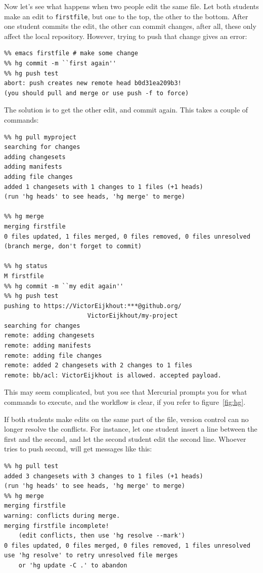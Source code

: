 Now let's see what happens when two people edit the same file.
Let both students make an edit to \verb+firstfile+, but one to the
top, the other to the bottom. After one student commits the edit, the
other can commit changes, after all, these only affect the local repository.
However, trying to push that change gives an error:
\begin{verbatim}
%% emacs firstfile # make some change
%% hg commit -m ``first again''
%% hg push test
abort: push creates new remote head b0d31ea209b3!
(you should pull and merge or use push -f to force)
\end{verbatim}
The solution is to get the other edit, and commit again. This takes a 
couple of commands:
{\small
\begin{verbatim}
%% hg pull myproject
searching for changes
adding changesets
adding manifests
adding file changes
added 1 changesets with 1 changes to 1 files (+1 heads)
(run 'hg heads' to see heads, 'hg merge' to merge)

%% hg merge
merging firstfile
0 files updated, 1 files merged, 0 files removed, 0 files unresolved
(branch merge, don't forget to commit)

%% hg status
M firstfile
%% hg commit -m ``my edit again''
%% hg push test
pushing to https://VictorEijkhout:***@github.org/
                       VictorEijkhout/my-project
searching for changes
remote: adding changesets
remote: adding manifests
remote: adding file changes
remote: added 2 changesets with 2 changes to 1 files
remote: bb/acl: VictorEijkhout is allowed. accepted payload.
\end{verbatim}
}

This may seem complicated, but you see that Mercurial prompts you 
for what commands to execute, and the workflow is clear, if you refer
to figure~\ref{fig:hg}.


If both students make edits on the same part of the file, version
control can no
longer resolve the conflicts. For instance, let one student insert a
line between the first and the second, and let the second student edit
the second line. Whoever tries to push second, will get messages
like this:
{\small
\begin{verbatim}
%% hg pull test
added 3 changesets with 3 changes to 1 files (+1 heads)
(run 'hg heads' to see heads, 'hg merge' to merge)
%% hg merge
merging firstfile
warning: conflicts during merge.
merging firstfile incomplete! 
    (edit conflicts, then use 'hg resolve --mark')
0 files updated, 0 files merged, 0 files removed, 1 files unresolved
use 'hg resolve' to retry unresolved file merges 
    or 'hg update -C .' to abandon
\end{verbatim}
}


